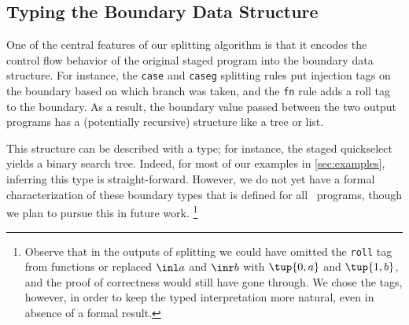 \begin{abstrsyn}
\subsection{Typing the Boundary Data Structure}

One of the central features of our splitting algorithm is that
it encodes the control flow behavior of the original 
staged program into the boundary data structure.
For instance, the {\tt case} and {\tt caseg} splitting rules 
put injection tags on the boundary based on which branch was taken,
and the {\tt fn} rule adds a roll tag to the boundary.
As a result, the boundary value passed between the two output programs has a (potentially recursive) structure like a tree or list.

This structure can be described with a type; for instance, the staged quickselect yields a binary search tree.
Indeed, for most of our examples in \ref{sec:examples}, inferring this type is straight-forward. 
However, we do not yet have a formal characterization of these boundary types that is defined for all \lang\ programs,
though we plan to pursue this in future work.
\footnote{Observe that in the outputs of splitting we could have omitted the {\tt roll} tag from functions or 
replaced $\inl a$ and $\inr b$ with $\tup {0,a}$ and $\tup {1,b}$, and the proof of correctness would still have gone through.
We chose the tags, however, in order to keep the typed interpretation more natural, even in absence of a formal result.
}
\end{abstrsyn}

